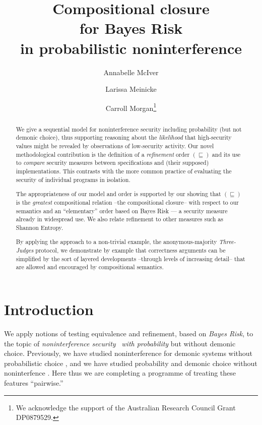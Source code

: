 \documentclass[runningheads]{llncs}
\newcommand\Ref {\mathrel{\sqsubseteq}}
\begin{document}
\title{Compositional closure \\
for Bayes Risk \\
in probabilistic noninterference}
\author{Annabelle McIver \and Larissa Meinicke \and Carroll Morgan\thanks{We acknowledge the support of the Australian Research Council Grant {DP0879529}.}}
\maketitle

\begin{abstract}
We give a sequential model for noninterference security including probability (but not demonic choice), thus supporting reasoning about the \emph{likelihood} that high-security values might be revealed by observations of low-security activity. Our novel methodological contribution is the definition of a \emph{refinement} order $(\Ref)$ and its use to \emph{compare} security measures between specifications and (their supposed) implementations. This contrasts with the more common practice of evaluating the security of individual programs in isolation.

\medskip
The appropriateness of our model and order is supported by our showing that $(\Ref)$ is the \emph{greatest} compositional relation --the compositional closure-- with respect to our semantics and an ``elementary'' order based on Bayes Risk --- a security measure already in widespread use. We also relate refinement to other measures such as Shannon Entropy.

\medskip
By applying the approach to a non-trivial example, the anonymous-majority \emph{Three-Judges} protocol, we demonstrate by example that correctness arguments can be simplified by the sort of layered developments --through levels of increasing detail-- that are allowed and encouraged by compositional semantics.
\end{abstract}

\tableofcontents

\newpage
\section{Introduction}
We apply notions of testing equivalence and refinement, based on \emph{Bayes Risk}, to the topic of \emph{noninterference security}~\cite{Goguen:84} \emph{with probability} but without demonic choice. Previously, we have studied noninterference for demonic systems without probabilistic choice \cite{Morgan:06,Morgan:07}, and we have studied probability and demonic choice without noninterfence \cite{Morgan:96d,McIver:05a}. Here thus we are completing a programme of treating these features ``pairwise.''
\end{document}
